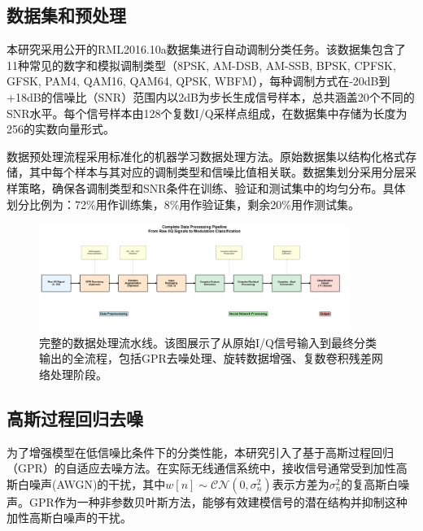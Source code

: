 \documentclass[conference]{IEEEtran}
\begin{document}
\subsection{数据集和预处理}

本研究采用公开的RML2016.10a数据集进行自动调制分类任务。该数据集包含了11种常见的数字和模拟调制类型（8PSK, AM-DSB, AM-SSB, BPSK, CPFSK, GFSK, PAM4, QAM16, QAM64, QPSK, WBFM），每种调制方式在-20dB到+18dB的信噪比（SNR）范围内以2dB为步长生成信号样本，总共涵盖20个不同的SNR水平。每个信号样本由128个复数I/Q采样点组成，在数据集中存储为长度为256的实数向量形式。

数据预处理流程采用标准化的机器学习数据处理方法。原始数据集以结构化格式存储，其中每个样本与其对应的调制类型和信噪比值相关联。数据集划分采用分层采样策略，确保各调制类型和SNR条件在训练、验证和测试集中的均匀分布。具体划分比例为：72\%用作训练集，8\%用作验证集，剩余20\%用作测试集。


\begin{figure}[htbp]
\centering
\includegraphics[width=0.9\textwidth]{figure/data_processing_pipeline.png}
\caption{完整的数据处理流水线。该图展示了从原始I/Q信号输入到最终分类输出的全流程，包括GPR去噪处理、旋转数据增强、复数卷积残差网络处理阶段。}
\label{fig:data_pipeline}
\end{figure}

\subsection{高斯过程回归去噪}

为了增强模型在低信噪比条件下的分类性能，本研究引入了基于高斯过程回归（GPR）的自适应去噪方法。在实际无线通信系统中，接收信号通常受到加性高斯白噪声(AWGN)的干扰，其中$w[n] \sim \mathcal{CN}(0, \sigma_n^2)$表示方差为$\sigma_n^2$的复高斯白噪声。GPR作为一种非参数贝叶斯方法，能够有效建模信号的潜在结构并抑制这种加性高斯白噪声的干扰。
\end{document}
